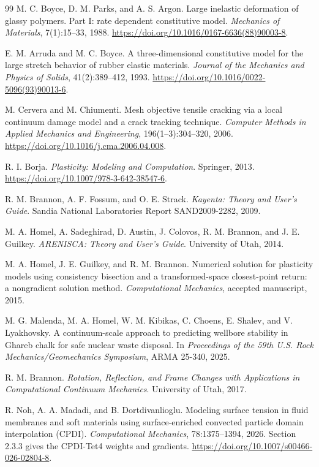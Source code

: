 \begin{thebibliography}{99}
M. C. Boyce, D. M. Parks, and A. S. Argon.
\newblock Large inelastic deformation of glassy polymers. Part I: rate dependent constitutive model.
\newblock \emph{Mechanics of Materials}, 7(1):15--33, 1988.
\newblock \url{https://doi.org/10.1016/0167-6636(88)90003-8}.

E. M. Arruda and M. C. Boyce.
\newblock A three-dimensional constitutive model for the large stretch behavior of rubber elastic materials.
\newblock \emph{Journal of the Mechanics and Physics of Solids}, 41(2):389--412, 1993.
\newblock \url{https://doi.org/10.1016/0022-5096(93)90013-6}.

M. Cervera and M. Chiumenti.
\newblock Mesh objective tensile cracking via a local continuum damage model and a crack tracking technique.
\newblock \emph{Computer Methods in Applied Mechanics and Engineering}, 196(1--3):304--320, 2006.
\newblock \url{https://doi.org/10.1016/j.cma.2006.04.008}.

R. I. Borja.
\newblock \emph{Plasticity: Modeling and Computation}.
\newblock Springer, 2013.
\newblock \url{https://doi.org/10.1007/978-3-642-38547-6}.



R. M. Brannon, A. F. Fossum, and O. E. Strack.
\newblock \emph{Kayenta: Theory and User's Guide}.
\newblock Sandia National Laboratories Report SAND2009-2282, 2009.

M. A. Homel, A. Sadeghirad, D. Austin, J. Colovos, R. M. Brannon, and J. E. Guilkey.
\newblock \emph{ARENISCA: Theory and User's Guide}.
\newblock University of Utah, 2014.

M. A. Homel, J. E. Guilkey, and R. M. Brannon.
\newblock Numerical solution for plasticity models using consistency bisection and a transformed-space closest-point return: a nongradient solution method.
\newblock \emph{Computational Mechanics}, accepted manuscript, 2015.

M. G. Malenda, M. A. Homel, W. M. Kibikas, C. Choens, E. Shalev, and V. Lyakhovsky.
\newblock A continuum-scale approach to predicting wellbore stability in Ghareb chalk for safe nuclear waste disposal.
\newblock In \emph{Proceedings of the 59th U.S. Rock Mechanics/Geomechanics Symposium}, ARMA 25-340, 2025.

R. M. Brannon.
\newblock \emph{Rotation, Reflection, and Frame Changes with Applications in Computational Continuum Mechanics}.
\newblock University of Utah, 2017.

R. Noh, A. A. Madadi, and B. Dortdivanlioglu.
\newblock Modeling surface tension in fluid membranes and soft materials using surface-enriched convected particle domain interpolation (CPDI).
\newblock \emph{Computational Mechanics}, 78:1375--1394, 2026. Section 2.3.3 gives the CPDI-Tet4 weights and gradients.
\newblock \url{https://doi.org/10.1007/s00466-026-02804-8}.

\end{thebibliography}

